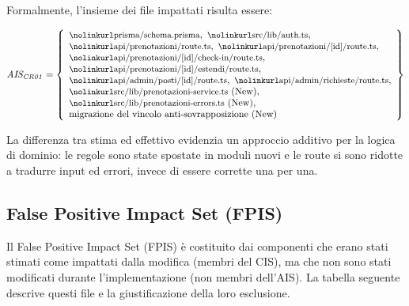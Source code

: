 \documentclass[11pt,a4paper,oneside,openany]{book}
\newcommand{\insieme}[2]{%
  \[ \mathit{#1} = \left\{ \begin{array}{l} #2 \end{array} \right\} \]}
\newcommand{\elem}[1]{\text{\file{#1}}}
\begin{document}
Formalmente, l'insieme dei file impattati risulta essere:

\insieme{AIS_{CR01}}{
  \elem{prisma/schema.prisma},\ \elem{src/lib/auth.ts},\\
  \elem{api/prenotazioni/route.ts},\ \elem{api/prenotazioni/[id]/route.ts},\\
  \elem{api/prenotazioni/[id]/check-in/route.ts},\\
  \elem{api/prenotazioni/[id]/estendi/route.ts},\\
  \elem{api/admin/posti/[id]/route.ts},\ \elem{api/admin/richieste/route.ts},\\
  \elem{src/lib/prenotazioni-service.ts}\ \text{(New)},\\
  \elem{src/lib/prenotazioni-errors.ts}\ \text{(New)},\\
  \text{migrazione del vincolo anti-sovrapposizione (New)}}

La differenza tra stima ed effettivo evidenzia un approccio additivo per la
logica di dominio: le regole sono state spostate in moduli nuovi e le route si
sono ridotte a tradurre input ed errori, invece di essere corrette una per
una.

\subsection{False Positive Impact Set (FPIS)}

Il False Positive Impact Set (FPIS) è costituito dai componenti che erano
stati stimati come impattati dalla modifica (membri del CIS), ma che non sono
stati modificati durante l'implementazione (non membri dell'AIS). La tabella
seguente descrive questi file e la giustificazione della loro esclusione.
\end{document}
